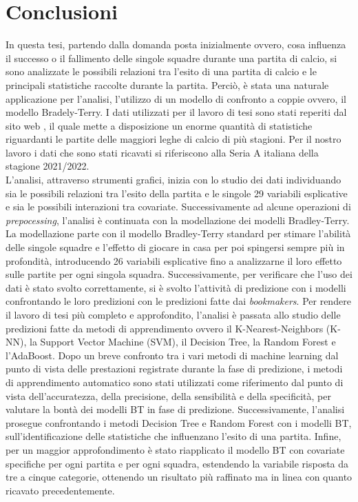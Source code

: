 \chapter{Conclusioni}
\label{cap:conclusioni}

In questa tesi, partendo dalla domanda posta inizialmente ovvero, cosa influenza il successo o il fallimento delle singole squadre durante una partita di calcio, si sono analizzate le possibili relazioni tra l'esito di una partita di calcio e le principali statistiche raccolte durante la partita. Perciò, è stata una naturale applicazione per l'analisi, l'utilizzo di un modello di confronto a coppie ovvero, il modello Bradely-Terry. I dati utilizzati per il lavoro di tesi sono stati reperiti dal sito web \textit{\cite{fbref}}, il quale mette a disposizione un enorme quantità di statistiche riguardanti le partite delle maggiori leghe di calcio di più stagioni. Per il nostro lavoro i dati che sono stati ricavati si riferiscono alla Seria A italiana della stagione 2021/2022.\\
L'analisi, attraverso strumenti grafici, inizia con lo studio dei dati individuando sia le possibili relazioni tra l'esito della partita e le singole 29 variabili esplicative e sia le possibili interazioni tra covariate. Successivamente ad alcune operazioni di \emph{prepocessing}, l'analisi è continuata con la modellazione dei modelli Bradley-Terry. La modellazione parte con il modello Bradley-Terry standard per stimare l'abilità delle singole squadre e l'effetto di giocare in casa per poi spingersi sempre più in profondità, introducendo 26 variabili esplicative fino a analizzarne il loro effetto sulle partite per ogni singola squadra. Successivamente, per verificare che l'uso dei dati è stato svolto correttamente, si è svolto l'attività di predizione con i modelli confrontando le loro predizioni con le predizioni fatte dai \emph{bookmakers}. Per rendere il lavoro di tesi più completo e approfondito, l'analisi è passata allo studio delle predizioni fatte da metodi di apprendimento ovvero il K-Nearest-Neighbors (K-NN), la Support Vector Machine (SVM), il Decision Tree, la Random Forest e l'AdaBoost. Dopo un breve confronto tra i vari metodi di machine learning dal punto di vista delle prestazioni registrate durante la fase di predizione, i metodi di apprendimento automatico sono stati utilizzati come riferimento dal punto di vista dell'accuratezza, della precisione, della sensibilità e della specificità, per valutare la bontà dei modelli BT in fase di predizione. Successivamente, l'analisi prosegue confrontando i metodi Decision Tree e Random Forest con i modelli BT, sull'identificazione delle statistiche che influenzano l'esito di una partita. Infine, per un maggior approfondimento è stato riapplicato il modello BT con covariate specifiche per ogni partita e per ogni squadra, estendendo la variabile risposta da tre a cinque categorie, ottenendo un risultato più raffinato ma in linea con quanto ricavato precedentemente.\\
